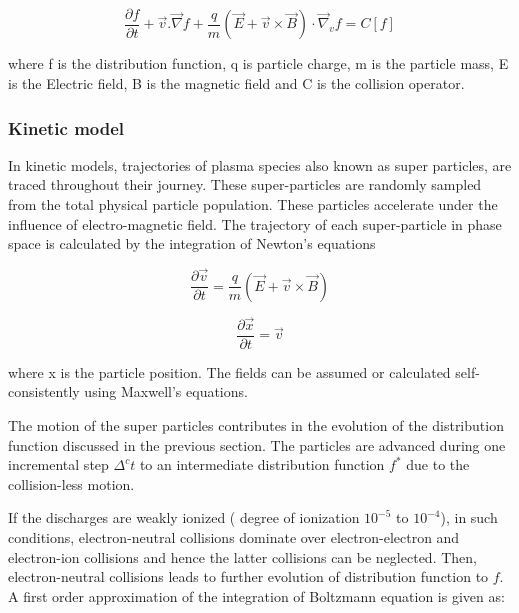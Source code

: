 \documentclass[paper=a4, fontsize=13pt]{scrartcl}
\begin{document}
\begin{equation} \label{eq:Boltzmann Eqn}
\frac{\partial f}{\partial t} + \vec{v}.\vec{\nabla} f + \frac{q}{m} (\vec{E} + \vec{v} \times \vec{B}) \cdot \vec{\nabla}_v f = C[f] 
\end{equation}

where f is the distribution function, q is particle charge, m is the particle mass, E is the Electric field, B is the magnetic field and C is the collision operator. 

\subsubsection{Kinetic model}

In kinetic models, trajectories of plasma species also known as super particles, are traced throughout their journey. These super-particles are randomly sampled from the total physical particle population. These particles accelerate under the influence of electro-magnetic field. The trajectory of each super-particle in phase space is calculated by the integration of Newton's equations

\begin{equation}
\frac{\partial \vec{v}}{\partial t} = \frac{q}{m} (\vec{E} + \vec{v} \times \vec{B})
\end{equation}

\begin{equation}
\frac{\partial \vec{x}}{\partial t} = \vec{v}
\end{equation}


where x is the particle position. The fields can be assumed or calculated self-consistently using Maxwell's equations.
 

The motion of the super particles contributes in the evolution of the distribution function discussed in the previous section. The particles are advanced during one incremental step $\Delta^c t$ to an intermediate distribution function $f^*$ due to the collision-less motion. 

If the discharges are weakly ionized ( degree of ionization $10^{-5}$ to $10^{-4}$), in such conditions, electron-neutral collisions dominate over electron-electron and electron-ion collisions and hence the latter collisions can be neglected. Then, electron-neutral collisions leads to further evolution of distribution function to $f$. A first order approximation of the integration of Boltzmann equation is given as:
\end{document}
